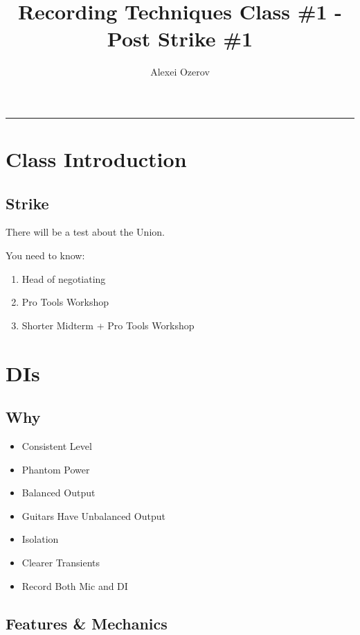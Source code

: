 \documentclass{article}
\author{Alexei Ozerov}
\date{}
\title{Recording Techniques Class \#1 - Post Strike \#1}
\begin{document}
\maketitle

\tableofcontents

\begin{center}
\noindent\rule{14cm}{0.4pt}
\end{center}

\pagebreak

\section{Class Introduction}

\subsection{Strike}

There will be a test about the Union.

\medskip

You need to know:

\medskip

\begin{enumerate}
\item Head of negotiating
\item Pro Tools Workshop
\item Shorter Midterm + Pro Tools Workshop
\end{enumerate}

\section{DIs}

\subsection{Why}

\begin{itemize}
\item Consistent Level
\item Phantom Power
\item Balanced Output
\item Guitars Have Unbalanced Output
\item Isolation
\item Clearer Transients
\item Record Both Mic and DI
\end{itemize}

\subsection{Features \& Mechanics}
\end{document}

